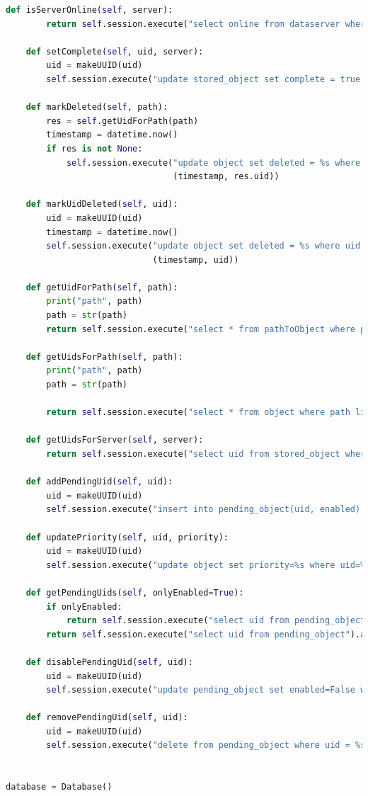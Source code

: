 \documentclass{article}
\begin{document}
\begin{lstlisting}[language=Python, title=Codice]
    def isServerOnline(self, server):
        return self.session.execute("select online from dataserver where server = %s", (server, )).one().online

    def setComplete(self, uid, server):
        uid = makeUUID(uid)
        self.session.execute("update stored_object set complete = true where uid = %s and server = %s", (uid, server))

    def markDeleted(self, path):
        res = self.getUidForPath(path)
        timestamp = datetime.now()
        if res is not None:
            self.session.execute("update object set deleted = %s where uid = %s",
                                 (timestamp, res.uid))

    def markUidDeleted(self, uid):
        uid = makeUUID(uid)
        timestamp = datetime.now()
        self.session.execute("update object set deleted = %s where uid = %s",
                             (timestamp, uid))

    def getUidForPath(self, path):
        print("path", path)
        path = str(path)
        return self.session.execute("select * from pathToObject where path = %s", (path, )).one()

    def getUidsForPath(self, path):
        print("path", path)
        path = str(path)

        return self.session.execute("select * from object where path like %s", (path, )).all()

    def getUidsForServer(self, server):
        return self.session.execute("select uid from stored_object where server = %s allow filtering", (server, ))

    def addPendingUid(self, uid):
        uid = makeUUID(uid)
        self.session.execute("insert into pending_object(uid, enabled) values (%s, True)", (uid, ))

    def updatePriority(self, uid, priority):
        uid = makeUUID(uid)
        self.session.execute("update object set priority=%s where uid=%s", (priority, uid))

    def getPendingUids(self, onlyEnabled=True):
        if onlyEnabled:
            return self.session.execute("select uid from pending_object where enabled=True allow filtering").all()
        return self.session.execute("select uid from pending_object").all()

    def disablePendingUid(self, uid):
        uid = makeUUID(uid)
        self.session.execute("update pending_object set enabled=False where uid = %s", (uid, ))

    def removePendingUid(self, uid):
        uid = makeUUID(uid)
        self.session.execute("delete from pending_object where uid = %s", (uid, ))


database = Database()
\end{lstlisting}
\end{document}
